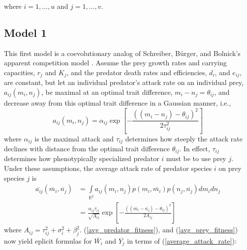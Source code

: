 \documentclass{amsart}
\theoremstyle{definition}
\theoremstyle{remark}
\numberwithin{equation}{section}
\begin{document}
where $i = 1, \dots, u$ and $j = 1, \dots, v$.

\subsection{Model 1}
This first model is a coevolutionary analog of Schreiber, B\"urger, and Bolnick's apparent competition model \cite{Schreiber_2011}.  Assume the prey growth rates and carrying capacities, $r_j$ and $K_j$, and the predator death rates and efficiencies, $d_i$, and $e_{ij}$, are constant, but let an individual predator's attack rate on an individual prey, $a_{ij}(m_i, n_j)$, be maximal at an optimal trait difference, $m_i - n_j = \theta_{ij}$, and decrease away from this optimal trait difference in a Gaussian manner, i.e.,
\begin{equation}
	\label{attack_rate}
	a_{ij}(m_i, n_j) = \alpha_{ij}\exp{\left[-\frac{((m_i - n_j) - \theta_{ij})^2}{2\tau_{ij}^2}\right]}
\end{equation}
where $\alpha_{ij}$ is the maximal attack and $\tau_{ij}$ determines how steeply the attack rate declines with distance from the optimal trait difference $\theta_{ij}$.  In effect, $\tau_{ij}$ determines how phenotypically specialized predator $i$ must be to use prey $j$.  Under these assumptions, the average attack rate of predator species $i$ on prey species $j$ is
\begin{equation}
	\label{average_attack_rate}
	\begin{aligned}
		\overline{a_{ij}}(\overline{m_i}, \overline{n_j}) &= \int\limits_{\mathbb{R}^2}a_{ij}(m_i, n_j)p(m_i, \overline{m_i})p(n_j, \overline{n_j})dm_idn_j \\
		&= \frac{\alpha_{ij}\tau_{ij}}{\sqrt{A_{ij}}}\exp{\left[-\frac{((\overline{m_i} - \overline{n_j}) - \theta_{ij})^2}{2A_{ij}}\right]}
	\end{aligned}
\end{equation}
where $A_{ij} = \tau_{ij}^2 + \sigma_i^2 + \beta_j^2$.  (\ref{avg_predator_fitness}), and (\ref{avg_prey_fitness}) now yield eplicit formulas for $\overline{W_i}$ and $\overline{Y_j}$ in terms of (\ref{average_attack_rate}):
\end{document}
